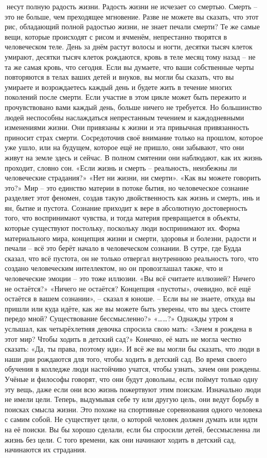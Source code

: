 \documentclass[a4paper]{book}
\begin{document}
несут полную радость жизни. Радость жизни не исчезает со смертью. Смерть – это не
больше, чем преходящее мгновение. Разве не можете вы сказать, что этот рис, обладающий
полной радостью жизни, не знает печали смерти?
Те же самые вещи, которые происходят с рисом и ячменём, непрестанно творятся в
человеческом теле. День за днём растут волосы и ногти, десятки тысяч клеток умирают,
десятки тысяч клеток рождаются, кровь в теле месяц тому назад – не та же самая кровь, что
сегодня. Если вы думаете, что ваши собственные черты повторяются в телах ваших детей и
внуков, вы могли бы сказать, что вы умираете и возрождаетесь каждый день и будете жить в
течение многих поколений после смерти.
Если участие в этом цикле может быть пережито и прочувствовано вами каждый день,
больше ничего не требуется. Но большинство людей неспособны наслаждаться
непрестанным течением и каждодневными изменениями жизни. Они привязаны к жизни и
эта привычная привязанность приносит страх смерти. Сосредоточив своё внимание только
на прошлом, которое уже ушло, или на будущем, которое ещё не пришло, они забывают, что
они живут на земле здесь и сейчас. В полном смятении они наблюдают, как их жизнь
проходит, словно сон.
«Если жизнь и смерть – реальность, неизбежны ли человеческие страдания?»
«Нет ни жизни, ни смерти».
«Как вы можете говорить это?»
Мир – это единство материи в потоке бытия, но человеческое сознание разделяет этот
феномен, создав такую двойственность как жизнь и смерть, инь и ян, бытие и пустота.
Сознание приходит к вере в абсолютную достоверность того, что воспринимают чувства, и
тогда материя превращается в объекты, которые существуют постольку, поскольку люди
воспринимают их.
Форма материального мира, концепция жизни и смерти, здоровья и болезни, радости и
печали – всё это берёт начало в человеческом сознании. В сутре, где Будда сказал, что всё
пустота, он не только отвергал внутреннюю реальность того, что создано человеческим
интеллектом, но он провозглашал также, что и человеческие эмоции – это тоже иллюзии.
«Вы всё считаете иллюзией? Ничего не остаётся?»
«Ничего не остаётся? Концепция «пустоты», очевидно, всё ещё остаётся в вашем
сознании», – сказал я юноше. – Если вы не знаете, откуда вы пришли или куда идёте, как же
вы можете быть уверены, что вы здесь стоите передо мной? Существование бессмысленно?»
«……?»
Однажды утром я услышал, как четырёхлетняя девочка спросила свою мать: «Зачем я
рождена в этот мир? Чтобы ходить в детский сад?» Конечно, её мать не могла честно сказать:
«Да, ты права, поэтому иди». И всё же вы могли бы сказать, что люди в наши дни рождаются
для того, чтобы ходить в детский сад.
Во время своего обучения в колледже люди настойчиво учатся, чтобы узнать, зачем они
рождены. Учёные и философы говорят, что они будут довольны, если поймут только одну эту
вещь, даже если они всю жизнь пожертвуют этим поискам.
Изначально люди не имели цели. Теперь, выдумывая себе ту или другую цель, они ведут
борьбу в поисках смысла жизни. Это похоже на спортивные соревнования одного человека с
самим собой. Не существует цели, о которой человек должен думать или идти на её поиски.
Вы бы хорошо сделали, если бы спросили детей, бессмысленна ли жизнь без цели.
С того времени, как они начинают ходить в детский сад, начинаются их страдания.
\end{document}

